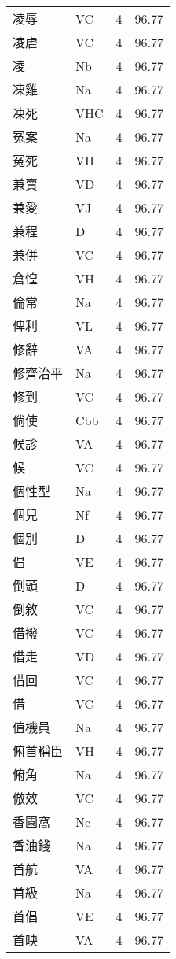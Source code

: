 \documentclass[twocolumn]{book}
\begin{document}
\begin{supertabular}{llrr}
凌辱 & VC & 4 &  96.77\\
凌虐 & VC & 4 &  96.77\\
凌 & Nb & 4 &  96.77\\
凍雞 & Na & 4 &  96.77\\
凍死 & VHC & 4 &  96.77\\
冤案 & Na & 4 &  96.77\\
冤死 & VH & 4 &  96.77\\
兼賣 & VD & 4 &  96.77\\
兼愛 & VJ & 4 &  96.77\\
兼程 & D & 4 &  96.77\\
兼併 & VC & 4 &  96.77\\
倉惶 & VH & 4 &  96.77\\
倫常 & Na & 4 &  96.77\\
俾利 & VL & 4 &  96.77\\
修辭 & VA & 4 &  96.77\\
修齊治平 & Na & 4 &  96.77\\
修到 & VC & 4 &  96.77\\
倘使 & Cbb & 4 &  96.77\\
候診 & VA & 4 &  96.77\\
候 & VC & 4 &  96.77\\
個性型 & Na & 4 &  96.77\\
個兒 & Nf & 4 &  96.77\\
個別 & D & 4 &  96.77\\
倡 & VE & 4 &  96.77\\
倒頭 & D & 4 &  96.77\\
倒敘 & VC & 4 &  96.77\\
借撥 & VC & 4 &  96.77\\
借走 & VD & 4 &  96.77\\
借回 & VC & 4 &  96.77\\
借 & VC & 4 &  96.77\\
值機員 & Na & 4 &  96.77\\
俯首稱臣 & VH & 4 &  96.77\\
俯角 & Na & 4 &  96.77\\
倣效 & VC & 4 &  96.77\\
香園窩 & Nc & 4 &  96.77\\
香油錢 & Na & 4 &  96.77\\
首航 & VA & 4 &  96.77\\
首級 & Na & 4 &  96.77\\
首倡 & VE & 4 &  96.77\\
首映 & VA & 4 &  96.77\\

\end{supertabular}
\end{document}
